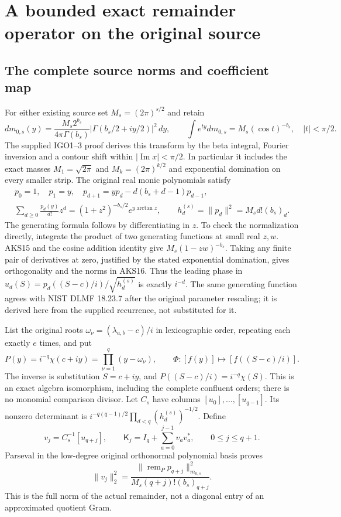 \documentclass[11pt,a4paper]{article}
\begin{document}
\section{A bounded exact remainder operator on the original source}
\label{sec:AKS-operator}

\subsection{The complete source norms and coefficient map}
For either existing source set $M_s=(2\pi)^{s/2}$ and retain
\[
 dm_{0,s}(y)=\frac{M_s2^{b_s}}{4\pi\Gamma(b_s)}
           |\Gamma(b_s/2+iy/2)|^2\,dy,\qquad
 \int e^{ty}dm_{0,s}=M_s(\cos t)^{-b_s},\quad |t|<\pi/2.
 \tag{AKS15}
\]
The supplied IGO1--3 proof derives this transform by the beta integral,
Fourier inversion and a contour shift within $|\operatorname{Im}x|<\pi/2$.
In particular it includes the exact masses $M_1=\sqrt{2\pi}$ and
$M_k=(2\pi)^{k/2}$ and exponential domination on every smaller strip.
The original real monic polynomials satisfy
\[
\begin{gathered}
 p_0=1,\quad p_1=y,\quad
 p_{d+1}=yp_d-d(b_s+d-1)p_{d-1},\\
 \sum_{d\ge0}\frac{p_d(y)}{d!}z^d
      =(1+z^2)^{-b_s/2}e^{y\arctan z},\qquad
 h_d^{(s)}=\|p_d\|^2=M_s d!(b_s)_d.
\end{gathered}\tag{AKS16}
\]
The generating formula follows by differentiating in $z$. To check the
normalization directly, integrate the product of two generating
functions at small real $z,w$. AKS15 and the cosine addition identity
give $M_s(1-zw)^{-b_s}$. Taking any finite pair of derivatives at zero,
justified by the stated exponential domination, gives orthogonality and
the norms in AKS16. Thus the leading phase in
$u_d(S)=p_d((S-c)/i)/\sqrt{h_d^{(s)}}$ is exactly $i^{-d}$.
The same generating function agrees with NIST DLMF 18.23.7 after the
original parameter rescaling; it is derived here from the supplied
recurrence, not substituted for it.

List the original roots
$\omega_\nu=(\lambda_{a,b}-c)/i$ in lexicographic order, repeating each
exactly $e$ times, and put
\[
 P(y)=i^{-q}\chi(c+iy)=\prod_{\nu=1}^q(y-\omega_\nu),\qquad
 \Phi:[f(y)]\mapsto[f((S-c)/i)].
 \tag{AKS17}
\]
The inverse is substitution $S=c+iy$, and
$P((S-c)/i)=i^{-q}\chi(S)$. This is an exact algebra isomorphism, including
the complete confluent orders; there is no monomial comparison divisor.
Let $C_s$ have columns $[u_0],\ldots,[u_{q-1}]$. Its nonzero determinant
is $i^{-q(q-1)/2}\prod_{d<q}(h_d^{(s)})^{-1/2}$. Define
\[
 v_j=C_s^{-1}[u_{q+j}],\qquad
 \mathsf K_j=I_q+\sum_{a=0}^{j-1}v_av_a^*,\qquad 0\le j\le q+1.
 \tag{AKS18}
\]
Parseval in the low-degree original orthonormal polynomial basis proves
\[
 \|v_j\|_2^2=
 \frac{\|\operatorname{rem}_P p_{q+j}\|_{m_{0,s}}^2}
      {M_s(q+j)!(b_s)_{q+j}}.
 \tag{AKS19}
\]
This is the full norm of the actual remainder, not a diagonal entry of
an approximated quotient Gram.
\end{document}
